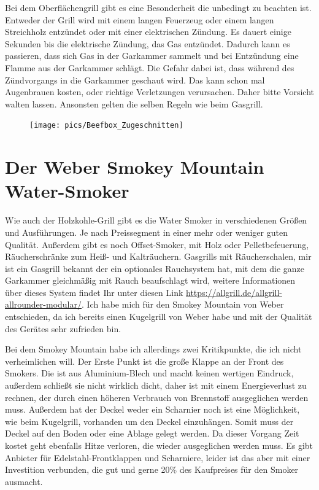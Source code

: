 	Bei dem Oberflächengrill gibt es eine Besonderheit die unbedingt zu beachten 
	ist. Entweder der Grill wird mit einem langen 
	Feuerzeug oder einem
	langen Streichholz entzündet oder mit einer elektrischen Zündung. Es dauert 
	einige Sekunden bis die elektrische Zündung, 
	das Gas entzündet. Dadurch kann es 
	passieren, dass sich Gas in der Garkammer sammelt und bei Entzündung eine 
	Flamme aus der Garkammer schlägt. Die 
	Gefahr dabei ist, dass während des 
	Zündvorgangs in die Garkammer geschaut wird. Das kann schon mal 
	Augenbrauen kosten, oder richtige Verletzungen 
	verursachen. Daher bitte Vorsicht walten 
	lassen. Ansonsten gelten die selben Regeln wie beim Gasgrill.
	
	
	\begin{figure}[htbp]
		\centering
		\begin{minipage}{1\textwidth}
			\centering
			\texttt{[image: pics/Beefbox\_Zugeschnitten]}
			\label{fig:Beefbox}
		\end{minipage}
	\end{figure}	
\newpage

\section{Der Weber Smokey Mountain Water-Smoker}

	Wie auch der Holzkohle-Grill gibt es die Water Smoker in verschiedenen 
	Größen und Ausführungen. Je nach Preissegment in 
	einer mehr oder weniger guten 
	Qualität.
	Außerdem gibt es noch Offset-Smoker, mit Holz oder Pelletbefeuerung, 
	Räucherschränke zum Heiß- und Kalträuchern. 
	Gasgrills mit Räucherschalen, mir ist
	ein Gasgrill bekannt der ein optionales Rauchsystem hat, mit dem die ganze 
	Garkammer gleichmäßig mit Rauch beaufschlagt 
	wird, weitere Informationen über 
	dieses System findet Ihr unter diesen Link 
	\url{https://allgrill.de/allgrill-allrounder-modular/}.
	Ich habe mich für den Smokey Mountain von Weber entschieden, da ich bereits 
	einen Kugelgrill von Weber habe und mit der 
	Qualität des Gerätes sehr zufrieden 
	bin.
	
	Bei dem Smokey Mountain habe ich allerdings zwei Kritikpunkte, die ich nicht 
	verheimlichen will. Der Erste Punkt ist die große 
	Klappe an der Front des Smokers. 
	Die ist aus Aluminium-Blech und macht keinen wertigen Eindruck, außerdem 
	schließt sie nicht wirklich dicht, daher ist mit 
	einem Energieverlust zu rechnen, der 
	durch einen höheren Verbrauch von Brennstoff ausgeglichen werden muss. 
	Außerdem hat der Deckel weder ein Scharnier 
	noch ist eine Möglichkeit, wie beim 
	Kugelgrill, vorhanden um den Deckel
	einzuhängen. Somit muss der Deckel auf den Boden oder eine Ablage gelegt 
	werden. Da dieser Vorgang Zeit kostet geht 
	ebenfalls Hitze verloren, die wieder 
	ausgeglichen werden muss.
	Es gibt Anbieter für Edelstahl-Frontklappen und Scharniere, leider ist das aber 
	mit einer Investition verbunden, die gut und 
	gerne 20\% des Kaufpreises für den 
	Smoker ausmacht.
	
